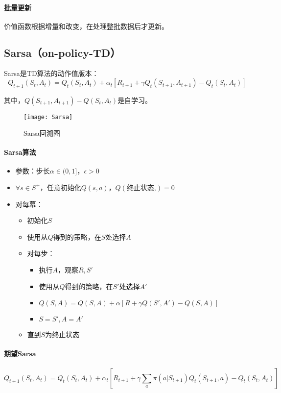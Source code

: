 \documentclass[
12pt, %
a4paper, 
oneside, %
headinclude,footinclude, %
]{scrartcl}
\begin{document}
\paragraph{批量更新}
价值函数根据增量和改变，在处理整批数据后才更新。
\subsection{Sarsa（on-policy-TD）}
Sarsa是TD算法的动作值版本：
$$
Q_{t + 1}(S_t, A_t) = Q_t(S_t, A_t) + \alpha_t[R_{t + 1} + \gamma Q_t(S_{t + 1}, A_{t + 1}) - Q_t(S_t, A_t)]
$$

其中，$ Q(S_{t + 1}, A_{t + 1}) - Q(S_t, A_t) $是自学习。

\begin{figure}[H]
\centering
\texttt{[image: Sarsa]}
\caption[Sarsa回溯图]{Sarsa回溯图}
\end{figure}
\paragraph{Sarsa算法}
\begin{itemize}
\item 参数：步长$ \alpha \in (0,1] $，$ \epsilon > 0 $
\item $ \forall s \in S^+ $，任意初始化$ Q(s,a) $，$ Q(\text{终止状态,}) = 0 $
\item 对每幕：
\begin{itemize}
\item 初始化$ S $
\item 使用从$ Q $得到的策略，在$ S $处选择$ A $
\item 对每步：
\begin{itemize}
\item 执行$ A $，观察$ R,S' $
\item 使用从$ Q $得到的策略，在$ S' $处选择$ A' $
\item $ Q(S, A) = Q(S, A) + \alpha [R + \gamma Q(S', A') - Q(S, A)] $
\item $ S = S', A = A' $
\end{itemize}
\item 直到$ S $为终止状态
\end{itemize}
\end{itemize}
\paragraph{期望Sarsa}
$$
Q_{t + 1}(S_t, A_t) = Q_t(S_t, A_t) + \alpha_t[R_{t + 1} + \gamma \sum_a \pi(a|S_{t + 1}) Q_t(S_{t + 1}, a) - Q_t(S_t, A_t)]
$$
\end{document}
